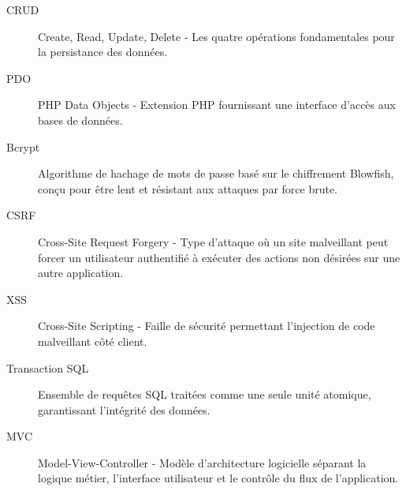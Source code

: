 \documentclass[12pt,a4paper]{report}
\begin{document}
\begin{description}
    \item[CRUD] Create, Read, Update, Delete - Les quatre opérations fondamentales pour la persistance des données.
    
    \item[PDO] PHP Data Objects - Extension PHP fournissant une interface d'accès aux bases de données.
    
    \item[Bcrypt] Algorithme de hachage de mots de passe basé sur le chiffrement Blowfish, conçu pour être lent et résistant aux attaques par force brute.
    
    \item[CSRF] Cross-Site Request Forgery - Type d'attaque où un site malveillant peut forcer un utilisateur authentifié à exécuter des actions non désirées sur une autre application.
    
    \item[XSS] Cross-Site Scripting - Faille de sécurité permettant l'injection de code malveillant côté client.
    
    \item[Transaction SQL] Ensemble de requêtes SQL traitées comme une seule unité atomique, garantissant l'intégrité des données.
    
    \item[MVC] Model-View-Controller - Modèle d'architecture logicielle séparant la logique métier, l'interface utilisateur et le contrôle du flux de l'application.
\end{description}
\end{document}
